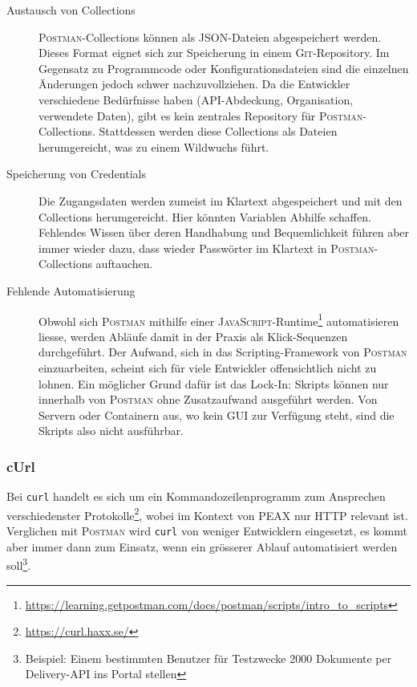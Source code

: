\begin{description}
    \item[Austausch von Collections] \textsc{Postman}-Collections können als JSON-Dateien abgespeichert werden. Dieses Format eignet sich zur Speicherung in einem \textsc{Git}-Repository. Im Gegensatz zu Programmcode oder Konfigurationsdateien sind die einzelnen Änderungen jedoch schwer nachzuvollziehen. Da die Entwickler verschiedene Bedürfnisse haben (API-Abdeckung, Organisation, verwendete Daten), gibt es kein zentrales Repository für \textsc{Postman}-Collections. Stattdessen werden diese Collections als Dateien herumgereicht, was zu einem Wildwuchs führt.
    \item[Speicherung von Credentials] Die Zugangsdaten werden zumeist im Klartext abgespeichert und mit den Collections herumgereicht. Hier könnten Variablen Abhilfe schaffen. Fehlendes Wissen über deren Handhabung und Bequemlichkeit führen aber immer wieder dazu, dass wieder Passwörter im Klartext in \textsc{Postman}-Collections auftauchen.
    \item[Fehlende Automatisierung] Obwohl sich \textsc{Postman} mithilfe einer \textsc{JavaScript}-Runtime\footnote{\url{https://learning.getpostman.com/docs/postman/scripts/intro_to_scripts}} automatisieren liesse, werden Abläufe damit in der Praxis als Klick-Sequenzen durchgeführt. Der Aufwand, sich in das Scripting-Framework von \textsc{Postman} einzuarbeiten, scheint sich für viele Entwickler offensichtlich nicht zu lohnen. Ein möglicher Grund dafür ist das Lock-In: Skripts können nur innerhalb von \textsc{Postman} ohne Zusatzaufwand ausgeführt werden. Von Servern oder Containern aus, wo kein GUI zur Verfügung steht, sind die Skripts also nicht ausführbar.
\end{description}

\subsubsection{cUrl}

Bei \texttt{curl} handelt es sich um ein Kommandozeilenprogramm zum Ansprechen verschiedenster Protokolle\footnote{\url{https://curl.haxx.se/}}, wobei im Kontext von PEAX nur HTTP relevant ist. Verglichen mit \textsc{Postman} wird \texttt{curl} von weniger Entwicklern eingesetzt, es kommt aber immer dann zum Einsatz, wenn ein grösserer Ablauf automatisiert werden soll\footnote{Beispiel: Einem bestimmten Benutzer für Testzwecke 2000 Dokumente per Delivery-API ins Portal stellen}.

